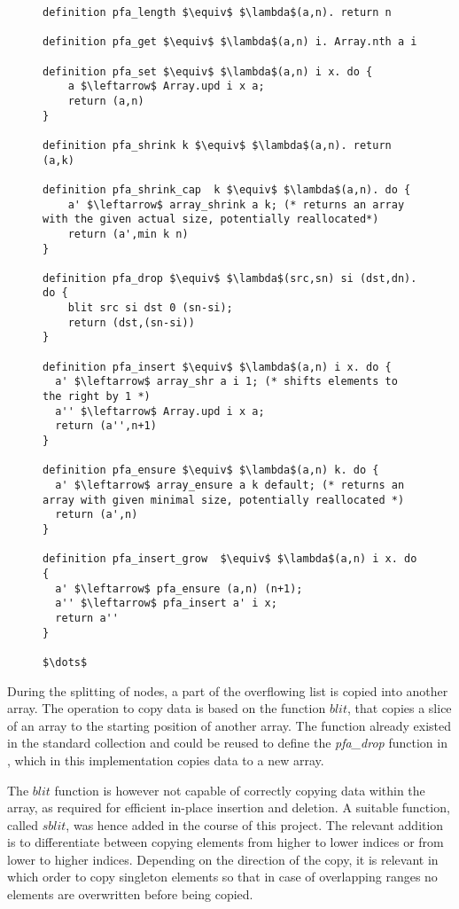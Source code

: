 \begin{figure}
\begin{lstlisting}[mathescape=true, language=Isabelle,label={lst:pfarray-def},
    caption={Important Partially Filled Array functions for Insertion.}]
definition pfa_length $\equiv$ $\lambda$(a,n). return n

definition pfa_get $\equiv$ $\lambda$(a,n) i. Array.nth a i

definition pfa_set $\equiv$ $\lambda$(a,n) i x. do {
    a $\leftarrow$ Array.upd i x a;
    return (a,n)
}

definition pfa_shrink k $\equiv$ $\lambda$(a,n). return (a,k)

definition pfa_shrink_cap  k $\equiv$ $\lambda$(a,n). do {
    a' $\leftarrow$ array_shrink a k; (* returns an array with the given actual size, potentially reallocated*)
    return (a',min k n)
}

definition pfa_drop $\equiv$ $\lambda$(src,sn) si (dst,dn). do {
    blit src si dst 0 (sn-si);
    return (dst,(sn-si))
}

definition pfa_insert $\equiv$ $\lambda$(a,n) i x. do {
  a' $\leftarrow$ array_shr a i 1; (* shifts elements to the right by 1 *)
  a'' $\leftarrow$ Array.upd i x a;
  return (a'',n+1)
}

definition pfa_ensure $\equiv$ $\lambda$(a,n) k. do {
  a' $\leftarrow$ array_ensure a k default; (* returns an array with given minimal size, potentially reallocated *)
  return (a',n)
}

definition pfa_insert_grow  $\equiv$ $\lambda$(a,n) i x. do {
  a' $\leftarrow$ pfa_ensure (a,n) (n+1);
  a'' $\leftarrow$ pfa_insert a' i x;
  return a''
}

$\dots$
\end{lstlisting}
\end{figure}


During the splitting of nodes, a part of the overflowing
list is copied into another array.
The operation to copy data is based on the function $blit$,
that copies a slice of an array to the starting position of another array.
The function already existed in the standard collection and could be reused
to define the \textit{pfa\_drop} function in , which in this implementation copies data to a new array.

The $blit$ function is however not capable of correctly copying data
within the array, as required for efficient in-place insertion and deletion.
A suitable function, called $sblit$, was hence added in the course of this project.
The relevant addition is to differentiate between copying elements
from higher to lower indices or from lower to higher indices.
Depending on the direction of the copy, it is relevant
in which order to copy singleton elements so that in case
of overlapping ranges no elements are overwritten before being copied.

